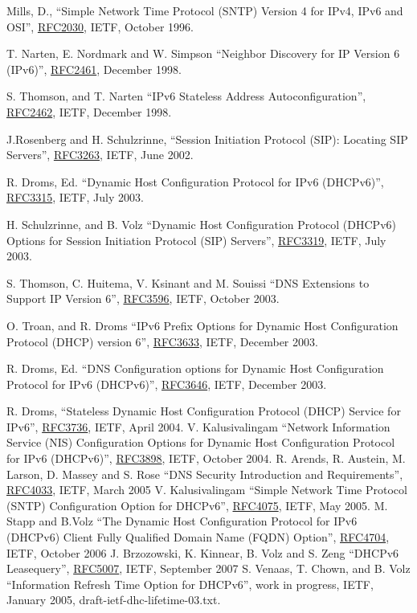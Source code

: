 \newpage

\newcommand{\rfc}[1]{\href{http://tools.ietf.org/html/rfc#1}{RFC#1}}
\begin{thebibliography}{1}

 Mills, D., ``Simple Network Time Protocol (SNTP) Version 4 for
        IPv4, IPv6 and OSI'', \rfc{2030}, IETF, October 1996.

 T. Narten, E. Nordmark and W. Simpson ``Neighbor
	Discovery for IP Version 6 (IPv6)'', \rfc{2461}, December 1998.

 S. Thomson, and T. Narten ``IPv6 Stateless Address
  Autoconfiguration'', \rfc{2462}, IETF, December 1998.

 J.Rosenberg and H. Schulzrinne, ``Session Initiation Protocol
       (SIP): Locating SIP Servers'', \rfc{3263}, IETF, June 2002.

 R. Droms, Ed. ``Dynamic Host Configuration Protocol
  for IPv6 (DHCPv6)'', \rfc{3315}, IETF, July 2003.

 H. Schulzrinne, and B. Volz ``Dynamic Host
  Configuration Protocol (DHCPv6) Options for Session Initiation
  Protocol (SIP) Servers'', \rfc{3319}, IETF, July 2003.

 S. Thomson, C. Huitema, V. Ksinant and M. Souissi
  ``DNS Extensions to Support IP Version 6'', \rfc{3596}, IETF, October
  2003.

 O. Troan, and R. Droms ``IPv6 Prefix Options for
  Dynamic Host Configuration Protocol (DHCP) version 6'', \rfc{3633},
  IETF, December 2003.

 R. Droms, Ed. ``DNS Configuration options for
  Dynamic Host Configuration Protocol for IPv6 (DHCPv6)'', \rfc{3646},
  IETF, December 2003.

 R. Droms, ``Stateless Dynamic Host Configuration
  Protocol (DHCP) Service for IPv6'', \rfc{3736}, IETF, April 2004.
 V. Kalusivalingam ``Network Information Service
  (NIS) Configuration Options for Dynamic Host Configuration Protocol
  for IPv6 (DHCPv6)'', \rfc{3898}, IETF, October 2004.
 R. Arends,  R. Austein, M. Larson, D. Massey and S. Rose
  ``DNS Security Introduction and Requirements'',
  \rfc{4033}, IETF, March 2005
 V. Kalusivalingam ``Simple Network Time Protocol
	(SNTP) Configuration Option for DHCPv6'', \rfc{4075}, IETF, May 2005.
 M. Stapp and  B.Volz ``The Dynamic Host
Configuration Protocol for IPv6 (DHCPv6) Client Fully Qualified Domain
Name (FQDN) Option'', \rfc{4704}, IETF, October 2006
 J. Brzozowski, K. Kinnear, B. Volz and S. Zeng
  ``DHCPv6 Leasequery'', \rfc{5007}, IETF, September 2007
 S. Venaas, T. Chown, and B. Volz
 ``Information Refresh Time Option for DHCPv6'', work in progress,
 IETF, January 2005, draft-ietf-dhc-lifetime-03.txt.


\end{thebibliography}
